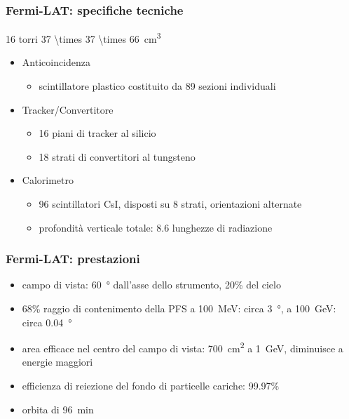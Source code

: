 \documentclass[10pt]{beamer}
\begin{document}
\begin{frame}
  \frametitle{Fermi-LAT: specifiche tecniche}
  16 torri \SI[parse-numbers=false]{37 \times 37 \times 66}{\centi\metre\cubed}
  \begin{itemize}
  \item Anticoincidenza
    \begin{itemize}
    \item scintillatore plastico costituito da 89 sezioni individuali
    \end{itemize}
  \item Tracker/Convertitore
    \begin{itemize}
    \item 16 piani di tracker al silicio
    \item 18 strati di convertitori al tungsteno
    \end{itemize}
  \item Calorimetro
    \begin{itemize}
    \item 96 scintillatori CsI, disposti su 8 strati, orientazioni alternate
    \item profondità verticale totale: 8.6 lunghezze di radiazione
    \end{itemize}
  \end{itemize}
\end{frame}

\begin{frame}
  \frametitle{Fermi-LAT: prestazioni}
  \begin{itemize}
  \item campo di vista: \SI{60}{\degree} dall'asse dello strumento, 20\% del
    cielo
  \item 68\% raggio di contenimento della PFS a \SI{100}{\mega\electronvolt}:
    circa \SI{3}{\degree}, a \SI{100}{\giga\electronvolt}: circa
    \SI{0.04}{\degree}
  \item area efficace nel centro del campo di vista:
    \SI{700}{\centi\metre\squared} a \SI{1}{\giga\electronvolt}, diminuisce a
    energie maggiori
  \item efficienza di reiezione del fondo di particelle cariche: 99.97\%
  \item orbita di \SI{96}{\minute}
  \end{itemize}
\end{frame}
\end{document}
